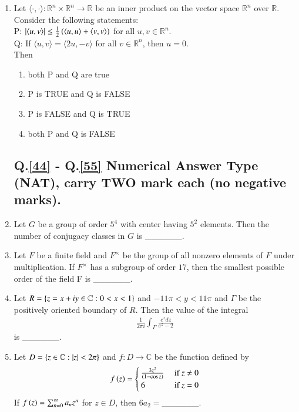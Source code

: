 \documentclass[journal]{IEEEtran}
\begin{document}
\begin{enumerate}
    \item Let $\langle \cdot, \cdot \rangle : \mathbb{R}^n \times \mathbb{R}^n \rightarrow \mathbb{R}$ be an inner product on the vector space $\mathbb{R}^n$ over $\mathbb{R}$. Consider the following statements:\\ P: $\left\vert\langle u,v \rangle\right\vert \leq \frac{1}{2}\left(\langle u,u \rangle + \langle v,v \rangle\right)$ for all $u,v \in \mathbb{R}^n$.\\Q: If $\langle u,v \rangle = \langle 2u,-v \rangle$ for all $v \in \mathbb{R}^n$, then $u=0$.\\Then
        \begin{enumerate}
            \item both P and Q are true
            \item P is TRUE and Q is FALSE
            \item P is FALSE and Q is TRUE
            \item both P and Q is FALSE
        \end{enumerate}

    \subsection*{Q.\ref{44} - Q.\ref{55} Numerical Answer Type (NAT), carry TWO mark each (no negative marks).}
    \item \label{44} Let $G$ be a group of order $5^4$ with center having $5^2$ elements. Then the number of conjugacy classes in $G$ is \_\_\_\_\_\_.
    \item Let $F$ be a finite field and $F^{\times}$ be the group of all nonzero elements of $F$ under multiplication. If $F^{\times}$ has a subgroup of order $17$, then the smallest possible order of the field F is \_\_\_\_\_\_.
    \item Let $R = \left\{z = x + iy \in \mathbb{C} : 0< x<1\right\}$ and $-11 \pi < y < 11 \pi$ and $\Gamma$ be the positively oriented boundary of $R$. Then the value of the integral
        \begin{align*}
            \frac{1}{2 \pi i} \int_{\Gamma} \frac{e^z dz}{e^z - 2}
        \end{align*}
        is \_\_\_\_\_\_.

    \item Let $D = \left\{z \in \mathbb{C} : \left\vert z\right\vert < 2 \pi\right\}$ and $f : D \rightarrow \mathbb{C}$ be the function defined by
        \begin{align*}
            f\left(z\right) = 
            \begin{cases}
                \frac{3 z^2}{\left(1 - \cos z\right)} &\text{ if } z \neq 0 \\
                6 &\text{ if } z = 0
            \end{cases}
        \end{align*}
        If $f\left(z\right) = \sum_{n=0}^{\infty} a_n z^n$ for $z \in D$, then $6a_2=$\_\_\_\_\_\_.


\end{enumerate}
\end{document}
